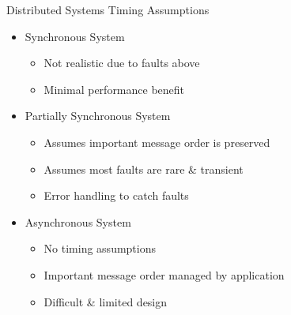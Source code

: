 \documentclass{slide}
\begin{document}

\begin{frame}{Distributed Systems Timing Assumptions}
    \vspace{1mm}
    {\LARGE
    \begin{itemize}
        \item<1-> Synchronous System
        \vspace{-3pt}
        \begin{itemize}
            \Large\item Not realistic due to faults above
            \Large\item Minimal performance benefit
        \end{itemize}
        \vspace{2mm}
        \item<2-> Partially Synchronous System
        \vspace{-3pt}
        \begin{itemize}
            \Large\item Assumes important message order is preserved
            \Large\item Assumes most faults are rare \& transient
            \Large\item Error handling to catch faults
        \end{itemize}
        \vspace{2mm}
        \item<3-> Asynchronous System
        \vspace{-3pt}
        \begin{itemize}
            \Large\item No timing assumptions
            \vspace{-1pt}
            \Large\item Important message order managed by application
            \Large\item Difficult \& limited design
        \end{itemize}
    \end{itemize}
    }
\end{frame}
\end{document}

